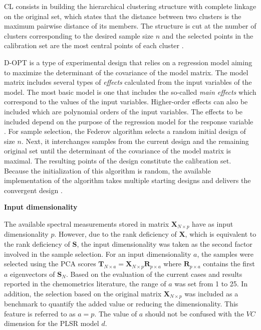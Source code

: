 \documentclass[journal=ancham,manuscript=article]{achemso}
\begin{document}
CL consists in building the hierarchical clustering structure with complete linkage on the original set, which states that the distance between two clusters is the maximum pairwise distance of its members. The structure is cut at the number of clusters corresponding to the desired sample size $n$ and the selected points in the calibration set are the most central points of each cluster \cite{Naes1990}.

D-OPT is a type of experimental design that relies on a regression model aiming to maximize the determinant of the covariance of the model matrix. The model matrix includes several types of \emph{effects} calculated from the input variables of the model. The most basic model is one that includes the so-called \emph{main effects} which correspond to the values of the input variables. Higher-order effects can also be included which are polynomial orders of the input variables. The effects to be included depend on the purpose of the regression model for the response variable \cite{Goos2011}. For sample selection, the Federov algorithm selects a random initial design of size $n$. Next, it interchanges samples from the current design and the remaining original set until the determinant of the covariance of the model matrix is maximal. The resulting points of the design constitute the calibration set. Because the initialization of this algorithm is random, the available implementation of the algorithm takes multiple starting designs and delivers the convergent design \cite{Wheeler2019}.


\textbf{Input dimensionality}

The available spectral measurements stored in matrix $\mathbf{X}_{N\times p}$ have as input dimensionality $p$. However, due to the rank deficiency of $\mathbf{X}$, which is equivalent to the rank deficiency of $\mathbf{S}$, the input dimensionality was taken as the second factor involved in the sample selection. For an input dimensionality $a$, the samples were selected using the PCA scores $\mathbf{T}_{N\times a} = \mathbf{X}_{N\times p}\mathbf{R}_{p\times a}$ where $\mathbf{R}_{p\times a}$ contains the first $a$ eigenvectors of $\mathbf{S}_N$. Based on the evaluation of the current cases and results reported in the chemometrics literature, the range of $a$ was set from 1 to 25. In addition, the selection based on the original matrix $\mathbf{X}_{N\times p}$ was included as a benchmark to quantify the added value or reducing the dimensionality. This feature is referred to as $a=p$. The value of $a$ should not be confused with the $VC$ dimension for the PLSR model $d$. 
\end{document}
